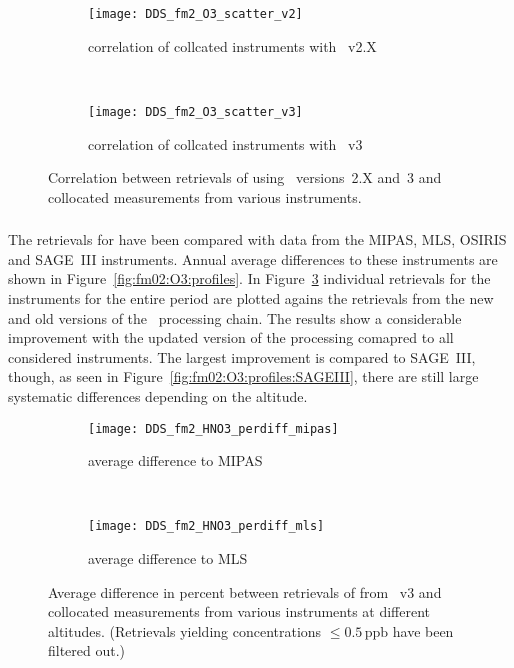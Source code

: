 \begin{figure}[htpb]
    \centering
    \begin{subfigure}[b]{0.49\textwidth}
        \texttt{[image: DDS\_fm2\_O3\_scatter\_v2]}
        \caption{correlation of collcated instruments with \smr~v2.X}
        \label{fig:fm02:O3:scatter:v2}
    \end{subfigure}
    \,
    \begin{subfigure}[b]{0.49\textwidth}
        \texttt{[image: DDS\_fm2\_O3\_scatter\_v3]}
        \caption{correlation of collcated instruments with \smr~v3}
        \label{fig:fm02:O3:scatter:v3}
    \end{subfigure}
    \caption{Correlation between retrievals of  using \smr\
    versions~2.X and~3 and collocated measurements from various instruments.}
    \label{fig:fm02:O3:scatter}
\end{figure}

\subsubsection{}
\label{sec:fm02:comparison:O3}
The retrievals for \chem{O_3} have been compared with data from the MIPAS, MLS,
OSIRIS and SAGE~III instruments. Annual average differences to these
instruments are shown in Figure~\ref{fig:fm02:O3:profiles}. In
Figure~\ref{fig:fm02:O3:scatter} individual retrievals for the instruments for
the entire period are plotted agains the retrievals from the new and old
versions of the \smr\ processing chain. The results show a considerable
improvement with the updated version of the processing comapred to all
considered instruments. The largest improvement is compared to SAGE~III,
though, as seen in Figure~\ref{fig:fm02:O3:profiles:SAGEIII}, there are still
large systematic differences depending on the altitude.



\begin{figure}[htpb]
    \centering
    \begin{subfigure}[b]{0.49\textwidth}
        \texttt{[image: DDS\_fm2\_HNO3\_perdiff\_mipas]}
        \caption{average difference to MIPAS}
        \label{fig:fm02:HNO3:profiles:MIPAS}
    \end{subfigure}
    \,
    \begin{subfigure}[b]{0.49\textwidth}
        \texttt{[image: DDS\_fm2\_HNO3\_perdiff\_mls]}
        \caption{average difference to MLS}
        \label{fig:fm02:HNO3:profiles:MLS}
    \end{subfigure}
    \caption{Average difference in percent between retrievals of 
    from \smr~v3 and collocated measurements from various instruments at
    different altitudes. (Retrievals yielding concentrations
    $\leq 0.5\,\mathrm{ppb}$ have been filtered out.)}

    \label{fig:fm02:HNO3:profiles}
\end{figure}

